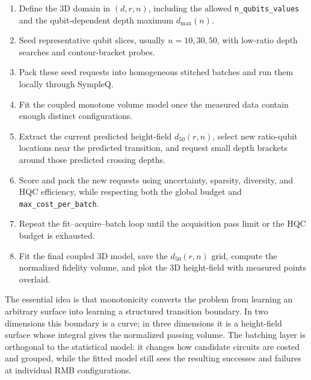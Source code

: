 \begin{enumerate}
    \item Define the 3D domain in \((d,r,n)\), including the allowed
    \texttt{n\_qubits\_values} and the qubit-dependent depth maximum
    \(d_{\max}(n)\).

    \item Seed representative qubit slices, usually \(n=10,30,50\), with
    low-ratio depth searches and contour-bracket probes.

    \item Pack these seed requests into homogeneous stitched batches and run
    them locally through SympleQ.

    \item Fit the coupled monotone volume model once the measured data contain
    enough distinct configurations.

    \item Extract the current predicted height-field \(d_{50}(r,n)\), select
    new ratio-qubit locations near the predicted transition, and request small
    depth brackets around those predicted crossing depths.

    \item Score and pack the new requests using uncertainty, sparsity,
    diversity, and HQC efficiency, while respecting both the global budget and
    \texttt{max\_cost\_per\_batch}.

    \item Repeat the fit--acquire--batch loop until the acquisition pass limit
    or the HQC budget is exhausted.

    \item Fit the final coupled 3D model, save the \(d_{50}(r,n)\) grid, compute
    the normalized fidelity volume, and plot the 3D height-field with measured
    points overlaid.
\end{enumerate}

The essential idea is that monotonicity converts the problem from learning an
arbitrary surface into learning a structured transition boundary.  In two
dimensions this boundary is a curve; in three dimensions it is a height-field
surface whose integral gives the normalized passing volume.  The batching layer
is orthogonal to the statistical model: it changes how candidate circuits are
costed and grouped, while the fitted model still sees the resulting successes
and failures at individual RMB configurations.

